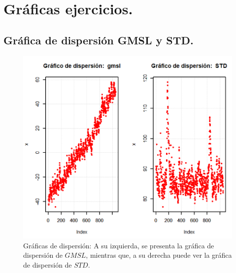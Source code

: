 \documentclass[10.5pt,notitlepage]{article}
\theoremstyle{plain}
\begin{document}
\newpage

\section{Gráficas ejercicios.}

\subsection{Gráfica de dispersión GMSL y STD.}
\begin{figure}[htb]
    \centering
    \includegraphics[scale = 0.4]{GraphDisp1.png}
    \caption{Gráficas de dispersión: A su izquierda, se presenta la gráfica de dispersión de \(GMSL\), mientras que, a su derecha puede ver la gráfica de dispersión de \(STD\).}
    \label{fig:1}
\end{figure}
\end{document}
